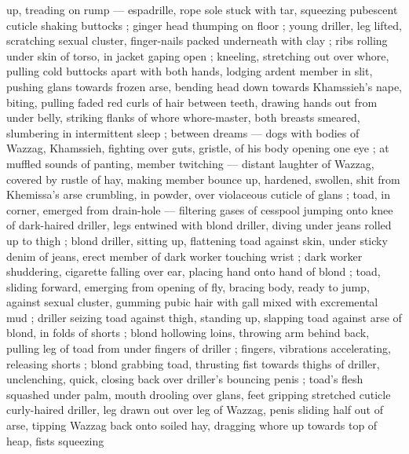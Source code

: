 up, treading on rump --- espadrille, rope sole stuck with tar, squeezing pubescent cuticle {\dashcom} shaking buttocks ; ginger head thumping on floor ; young driller, leg lifted, scratching sexual cluster, finger-nails packed underneath with clay ; ribs rolling under skin of torso, in jacket gaping open ; kneeling, stretching out over whore, pulling cold buttocks apart with both hands, lodging ardent member in slit, pushing glans towards frozen arse, bending head down towards Khamssieh's nape, biting, pulling faded red curls of hair between teeth, drawing hands out from under belly, striking flanks of whore  {\slashsemi} whore-master, both breasts smeared, slumbering in intermittent sleep ; between dreams --- dogs with bodies of Wazzag, Khamssieh, fighting over guts, gristle, of his body {\dashcom} opening one eye ; at muffled sounds of panting, member twitching --- distant laughter of Wazzag, covered by rustle of hay, making member bounce up, hardened, swollen, shit from Khemissa's arse crumbling, in powder, over violaceous cuticle of glans ; toad, in corner, emerged from drain-hole --- filtering gases of cesspool {\dashcom} jumping onto knee of dark-haired driller, legs entwined with blond driller, diving under jeans rolled up to thigh ; blond driller, sitting up, flattening toad against skin, under sticky denim of jeans, erect member of dark worker touching wrist ; dark worker shuddering, cigarette falling over ear, placing hand onto hand of blond ; toad, sliding forward, emerging from opening of fly, bracing body, ready to jump, against sexual cluster, gumming pubic hair with gall mixed with excremental mud ; driller seizing toad against thigh, standing up, slapping toad against arse of blond, in folds of shorts ; blond hollowing loins, throwing arm behind back, pulling leg of toad from under fingers of driller ; fingers, vibrations accelerating, releasing shorts ; blond grabbing toad, thrusting fist towards thighs of driller, unclenching, quick, closing back over driller's bouncing penis ; toad's flesh squashed under palm, mouth drooling over glans, feet gripping stretched cuticle {\semislash} curly-haired driller, leg drawn out over leg of Wazzag, penis sliding half out of arse, tipping Wazzag back onto soiled hay, dragging whore up towards top of heap, fists squeezing 
